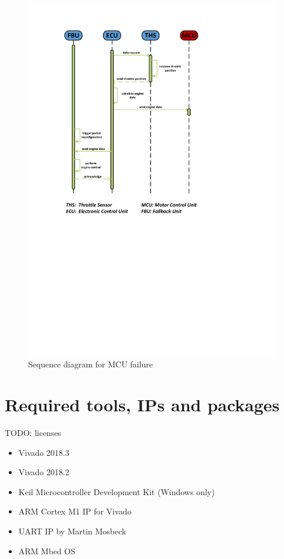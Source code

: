 \begin{figure}[h!]
    \centering
    \includegraphics[width=\textwidth]{figures/sequence_mcu_fail.pdf}
    \caption{Sequence diagram for \gls{MCU} failure}\label{fig:sequenceMCUFailure}
\end{figure}

\section{Required tools, \glspl{IP} and packages}
TODO: licenses
\begin{itemize}
    \item Vivado 2018.3
    \item Vivado 2018.2
    \item Keil Microcontroller Development Kit (Windows only)
    \item ARM Cortex M1 IP for Vivado
    \item UART IP by Martin Mosbeck
    \item ARM Mbed OS
\end{itemize}
